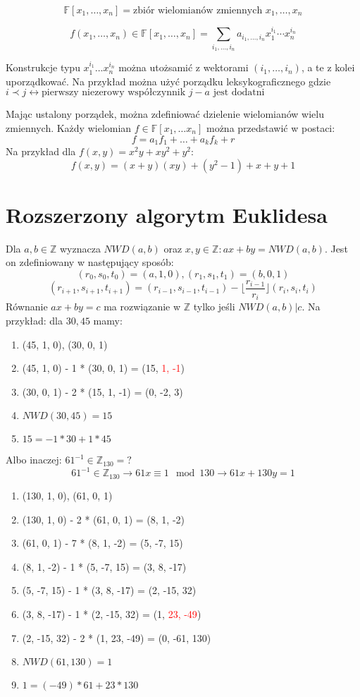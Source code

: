 \documentclass{../notatki}
\begin{document}
$$
\mathbb{F}[x_1, \dots, x_n] = \text{zbiór wielomianów zmiennych }
x_1, \dots, x_n
$$

$$
f(x_1, \dots, x_n) \in \mathbb{F}[x_1, \dots, x_n] = \sum_{i_1, \dots,
i_n} a_{i_1, \dots, i_n} x_1^{i_1} \cdots x_n^{i_n}
$$

Konstrukcje typu $x_1^{i_1} \dots x_n^{i_n}$ można utożsamić z
wektorami $(i_1, \dots, i_n)$, a te z kolei uporządkować. Na przykład można użyć
porządku leksykograficznego gdzie $i \prec j \leftrightarrow
\text{pierwszy niezerowy współczynnik } j - a \text{ jest dodatni}$

Mając ustalony porządek, można zdefiniować dzielenie wielomianów
wielu zmiennych. Każdy wielomian $f \in \mathbb{F}[x_1, \dots x_n]$
można przedstawić w postaci:
$$
f = a_1f_1 + \dots + a_kf_k + r
$$
Na przykład dla $f(x, y) = x^2y + xy^2 + y^2$:
$$
f(x, y) = (x + y)(xy) + (y^2 - 1) + x + y + 1
$$

\section{Rozszerzony algorytm Euklidesa}

Dla $a, b \in \mathbb{Z}$ wyznacza $NWD(a, b)$ oraz $x, y \in
\mathbb{Z} : ax + by = NWD(a, b)$. Jest on zdefiniowany w następujący sposób:
$$
(r_0, s_0, t_0) = (a, 1, 0), (r_1, s_1, t_1) = (b, 0, 1)
$$
$$
(r_{i + 1}, s_{i + 1}, t_{i + 1}) = (r_{i - 1}, s_{i - 1}, t_{i - 1}) - \lfloor
\frac{r_{i - 1}}{r_i} \rfloor (r_i, s_i, t_i)
$$
Równanie $ax + by = c$ ma rozwiązanie w $\mathbb{Z}$ tylko jeśli
$NWD(a, b) | c$.
Na przykład: dla $30, 45$ mamy:
\begin{enumerate}
  \item (45, 1, 0), (30, 0, 1)
  \item (45, 1, 0) - 1 * (30, 0, 1) = (15, \textcolor{red}{1, -1})
  \item (30, 0, 1) - 2 * (15, 1, -1) = (0, -2, 3)
  \item $NWD(30, 45) = 15$
  \item $15 = -1 * 30 + 1 * 45$
\end{enumerate}
Albo inaczej: $61^{-1} \in \mathbb{Z}_{130} = ?$
$$
61^{-1} \in \mathbb{Z}_{130} \rightarrow 61x \equiv 1 \mod 130
\rightarrow 61x + 130y = 1
$$
\begin{enumerate}
  \item (130, 1, 0), (61, 0, 1)
  \item (130, 1, 0) - 2 * (61, 0, 1) = (8, 1, -2)
  \item (61, 0, 1) - 7 * (8, 1, -2) = (5, -7, 15)
  \item (8, 1, -2) - 1 * (5, -7, 15) = (3, 8, -17)
  \item (5, -7, 15) - 1 * (3, 8, -17) = (2, -15, 32)
  \item (3, 8, -17) - 1 * (2, -15, 32) = (1, \textcolor{red}{23, -49})
  \item (2, -15, 32) - 2 * (1, 23, -49) = (0, -61, 130)
  \item $NWD(61, 130) = 1$
  \item $1 = (-49) * 61 + 23 * 130$
\end{enumerate}
\end{document}
